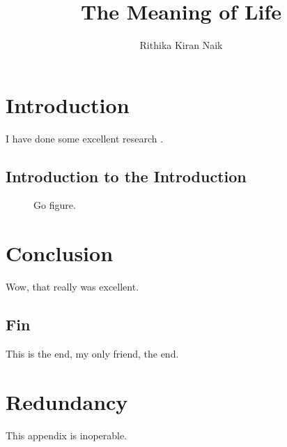 \documentclass[onehalf,11pt]{beavtex}
\title{The Meaning of Life}
\author{Rithika Kiran Naik}
\begin{document}
\maketitle

\mainmatter

\chapter{Introduction}
I have done some excellent research \cite{matrix}.
\section{Introduction to the Introduction}
\begin{figure}[!ht]
\centering
{}
\caption{Go figure.}
\end{figure}


\chapter{Conclusion}
Wow, that really was excellent.
\section{Fin}
This is the end, my only friend, the end.





\appendix
\chapter{Redundancy}
This appendix is inoperable.
\end{document}
